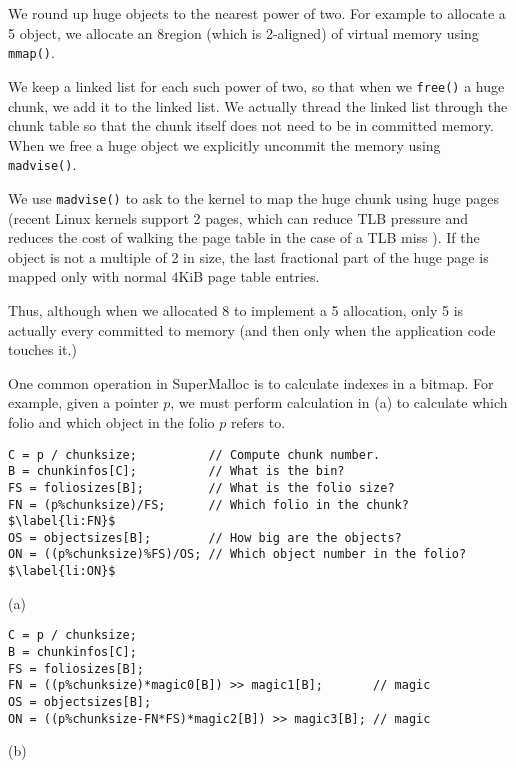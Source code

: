 \documentclass[pldi]{sigplanconf-pldi15}
\newcommand{\code}[1]{\texttt{#1}}
\begin{document}
We round up huge objects to the nearest power of two.  For example to
allocate a \unit{5}\mebi\byte{} object, we allocate an
\unit{8}\mebi\byte region (which is \unit{2}\mebi\byte{}-aligned) of
virtual memory using \code{mmap()}.

We keep a linked list for each such power of two, so that when we
\code{free()} a huge chunk, we add it to the linked list.  We actually
thread the linked list through the chunk table so that the chunk
itself does not need to be in committed memory.  When we free a huge
object we explicitly uncommit the memory using \code{madvise()}.

We use \code{madvise()} to ask to the kernel to map the huge chunk
using huge pages (recent Linux kernels support \unit{2}\mebi\byte{}
pages, which can reduce TLB pressure and reduces the cost of walking
the page table in the case of a TLB miss \cite{Corbet11}).  If the
object is not a multiple of \unit{2}\mebi\byte{} in size, the last
fractional part of the huge page is mapped only with normal $4$KiB
page table entries.

Thus, although when we allocated \unit{8}\mebi\byte{} to implement a
\unit{5}\mebi\byte{} allocation, only \unit{5}\mebi\byte{} is
actually every committed to memory (and then only when the application
code touches it.)


One common operation in SuperMalloc is to calculate indexes in a
bitmap.  For example, given a pointer $p$, we must perform calculation
in (a) to calculate which folio and which object in
the folio $p$ refers to.

\begin{figure*}
\begin{verbatim}
C = p / chunksize;          // Compute chunk number.
B = chunkinfos[C];          // What is the bin?
FS = foliosizes[B];         // What is the folio size?
FN = (p%chunksize)/FS;      // Which folio in the chunk?$\label{li:FN}$
OS = objectsizes[B];        // How big are the objects?
ON = ((p%chunksize)%FS)/OS; // Which object number in the folio?$\label{li:ON}$
\end{verbatim}
\begin{center}
(a)
\end{center}
\begin{verbatim}
C = p / chunksize;
B = chunkinfos[C];
FS = foliosizes[B];
FN = ((p%chunksize)*magic0[B]) >> magic1[B];       // magic
OS = objectsizes[B];
ON = ((p%chunksize-FN*FS)*magic2[B]) >> magic3[B]; // magic
\end{verbatim}
\begin{center}
(b)
\end{center}
\caption{The calculation to compute the folio number in the chunk,
  \code{FN}, and the object number in the folio \code{ON}, so that the
  bitmap for the free objects in the folio can be updated.  (a) shows
  the code with expensive divisions in .  (b) shows
  the code with the divisions replaced by multiplication and shift.}
\label{fig:bitindex}
\end{figure*}
\end{document}
